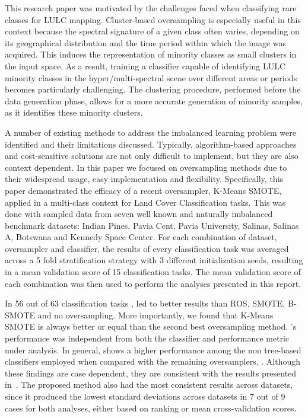 \documentclass[remotesensing,article,submit,moreauthors,pdftex]{Definitions/mdpi}
\begin{document}
\begin{paracol}{2}
This research paper was motivated by the challenges faced when classifying
rare classes for LULC mapping. Cluster-based oversampling is especially
useful in this context because the spectral signature of a given class often
varies, depending on its geographical distribution and the time period within
which the image was acquired. This induces the representation of minority
classes as small clusters in the input space. As a result, training a
classifier capable of identifying LULC minority classes in the
hyper/multi-spectral scene over different areas or periods becomes
particularly challenging. The clustering procedure, performed before the data
generation phase, allows for a more accurate generation of minority samples,
as it identifies these minority clusters.

A number of existing methods to address the imbalanced learning problem were
identified and their limitations discussed. Typically, algorithm-based
approaches and cost-sensitive solutions are not only difficult to implement,
but they are also context dependent. In this paper we focused on oversampling
methods due to their widespread usage, easy implementation and flexibility.
Specifically, this paper demonstrated the efficacy of a recent oversampler,
K-Means SMOTE, applied in a multi-class context for Land Cover Classification
tasks. This was done with sampled data from seven well known and naturally
imbalanced benchmark datasets: Indian Pines, Pavia Cent,
Pavia University, Salinas, Salinas A, Botswana and Kennedy Space Center. For
each combination of dataset, oversampler and classifier, the results of every
classification task was averaged across a 5 fold stratification strategy with
3 different initialization seeds, resulting in a mean validation score of 15
classification tasks. The mean validation score of each combination was then
used to perform the analyses presented in this report.

In 56 out of 63 classification tasks ,
 led to better results than ROS, SMOTE,
B-SMOTE and no oversampling. More importantly, we found that K-Means SMOTE is
always better or equal than the second best oversampling method.
's performance was independent from both the
classifier and performance metric under analysis. In general,
 shows a higher performance among the non
tree-based classifiers employed  when compared with the
remaining oversamplers, . Although these findings are case
dependent, they are consistent with the results presented
in~\cite{Douzas2018}. The proposed method also had the most consistent results
across datasets, since it produced the lowest standard deviations across
datasets in 7 out of 9 cases for both analyses, either based on ranking or
mean cross-validation scores.


\end{paracol}
\end{document}
